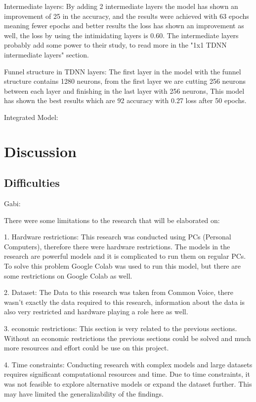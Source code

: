 \documentclass[a4paper]{article}
\begin{document}
Intermediate layers: By adding 2 intermediate layers the model has shown an improvement of 25 in the accuracy, and the results were achieved with 63 epochs meaning fewer epochs and better results the loss has shown an improvement as well, the loss by using the intimidating layers is 0.60. The intermediate layers probably add some power to their study, to read more in the "1x1 TDNN intermediate layers" section.

Funnel structure in TDNN layers: The first layer in the model with the funnel structure contains 1280 neurons, from the first layer we are cutting 256 neurons between each layer and finishing in the last layer with 256 neurons, This model has shown the best results which are 92 accuracy with 0.27 loss after 50 epochs.

Integrated Model: 




\section{Discussion}
\subsection{Difficulties}

Gabi:

There were some limitations to the research that will be elaborated on:

1. Hardware restrictions: This research was conducted using PCs (Personal  Computers), therefore there were hardware restrictions. The models in the research are powerful models and it is complicated to run them on regular PCs. To solve this problem Google Colab was used to run this model, but there are some restrictions on Google Colab as well.

2. Dataset: The Data to this research was taken from Common Voice, there wasn't exactly the data required to this research, information about the data is also very restricted and hardware playing a role here as well.

3. economic restrictions: This section is very related to the previous sections. Without an economic restrictions the previous sections could be solved and much more resources and effort could be use on this project.

4. Time constraints: Conducting research with complex models and large datasets requires significant computational resources and time. Due to time constraints, it was not feasible to explore alternative models or expand the dataset further. This may have limited the generalizability of the findings.
\end{document}
